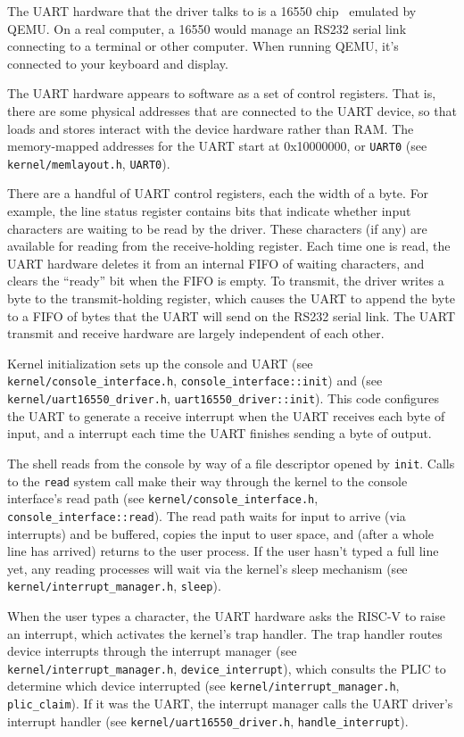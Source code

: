 The UART hardware that the driver talks to is a 16550
chip~\cite{ns16550a} emulated by QEMU. On a real computer, a 16550
would manage an RS232 serial link connecting to a terminal or other
computer. When running QEMU, it's connected to your keyboard and
display.

The UART hardware appears to software as a set of 
control registers. That is, there are some physical addresses that
are connected to the UART device, so that loads and stores
interact with the device hardware rather than RAM.
The memory-mapped addresses for the UART start at 0x10000000, or {\tt UART0}
(see \texttt{kernel/memlayout.h}, \texttt{UART0}).

There are a handful of UART control registers, each the width
of a byte. For example, the line status register contains bits that
indicate whether input characters are waiting to be read by the driver.
These characters (if any) are available for reading from the
receive-holding register. Each time one is read, the UART hardware
deletes it from an internal FIFO of waiting characters, and
clears the ``ready'' bit when the FIFO is empty.
To transmit, the driver writes a byte to the transmit-holding register,
which causes the UART to append the byte to a FIFO of bytes that the
UART will send on the RS232 serial link.
The UART transmit and receive hardware are largely independent
of each other.

Kernel initialization sets up the console and UART
(see \texttt{kernel/console\_interface.h}, \texttt{console\_interface::init})
and (see \texttt{kernel/uart16550\_driver.h}, \texttt{uart16550\_driver::init}).
This code configures the UART to generate
a receive interrupt when the UART receives each byte of input, and
a  interrupt each time the
UART finishes sending a byte of output.

The shell reads from the console by way of a file descriptor
opened by {\tt init}.
Calls to the {\tt read} system call make their way through the kernel to the
console interface's read path
(see \texttt{kernel/console\_interface.h}, \texttt{console\_interface::read}).
The read path waits for input to arrive (via interrupts) and be
buffered, copies the input to user space, and (after
a whole line has arrived) returns to the user process. If the user
hasn't typed a full line yet, any reading processes will wait via the kernel's
sleep mechanism
(see \texttt{kernel/interrupt\_manager.h}, \texttt{sleep}).

When the user types a character, the UART hardware asks the RISC-V
to raise an interrupt, which activates
the kernel's trap handler.
The trap handler routes device interrupts through the interrupt manager
(see \texttt{kernel/interrupt\_manager.h}, \texttt{device\_interrupt}),
which consults the PLIC to determine which device interrupted
(see \texttt{kernel/interrupt\_manager.h}, \texttt{plic\_claim}).
If it was the UART, the interrupt manager calls the UART driver's interrupt handler
(see \texttt{kernel/uart16550\_driver.h}, \texttt{handle\_interrupt}).

